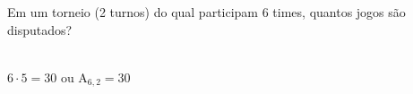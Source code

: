 \begin{ex}
 Em um torneio (2 turnos) do qual participam 6 times, quantos jogos são disputados?
   \begin{sol}
   \phantom{A} \\
   $6\cdot5=30$ ou  $\mathrm{A}_{6,2}=30$
   \end{sol}
\end{ex}